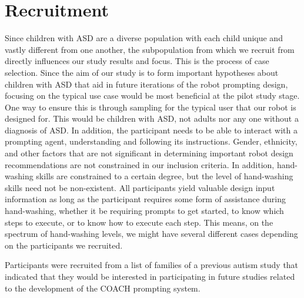 \documentclass{ut-thesis}
\providecommand{\DIFdelbegin}{} %
\begin{document}
\section{Recruitment}
\label{sec:Recruitment}
Since children with ASD are a diverse population with each child unique and vastly different from one another, the subpopulation from which we recruit from directly influences our study results and focus.  This is the process of case selection.  Since the aim of our study is to form important hypotheses about children with ASD that aid in future iterations of the robot prompting design, focusing on the typical use case would be most beneficial at the pilot study stage.  One way to ensure this is through sampling for the typical user that our robot is designed for.  This would be children with ASD, not adults nor any one without a diagnosis of ASD.  In addition, the participant needs to be able to interact with a prompting agent, understanding and following its instructions.  Gender, ethnicity, and other factors that are not significant in determining important robot design recommendations are not constrained in our inclusion criteria.  In addition, hand-washing skills are constrained to a certain degree, but the level of hand-washing skills need not be non-existent.  All participants yield valuable design input information as long as the participant requires some form of assistance during hand-washing, whether it be requiring prompts to get started, to know which steps to execute, or to know how to execute each step.  This means, on the spectrum of hand-washing levels, we might have several different cases depending on the participants we recruited.

Participants were recruited from a list of families of a previous autism study that indicated that they would be interested in participating in future studies related to the development of the COACH prompting system.  \DIFdelbegin %
\end{document}
